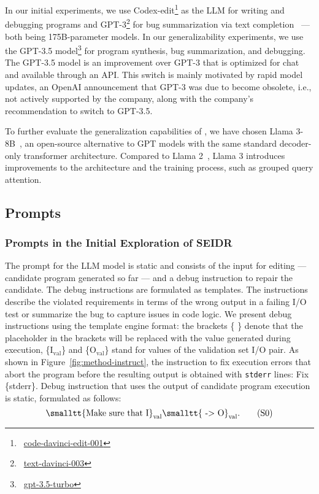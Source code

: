 In our initial experiments, we use Codex-edit\footnote{~\href{https://openai.com/index/gpt-3-edit-insert/}{code-davinci-edit-001}} 
as the LLM for writing and debugging programs and GPT-3\footnote{~\href{https://platform.openai.com/docs/deprecations}{text-davinci-003}} for bug summarization via text completion~\cite{brown2020:language} --- both being 175B-parameter models.
In our generalizability experiments, we use the GPT-3.5 model\footnote{~\href{https://platform.openai.com/docs/models/gpt-3-5-turbo}{gpt-3.5-turbo}} for program synthesis, bug summarization, and debugging. 
The GPT-3.5 model is an improvement over GPT-3 that is optimized for chat and available through an API.
This switch is mainly motivated by rapid model updates, an OpenAI announcement that GPT-3 was due to become obsolete, i.e., not actively supported by the company, along with the company's recommendation to switch to GPT-3.5. 

To further evaluate the generalization capabilities of \method{}, we have chosen Llama 3-8B~\cite{roziere2023:code}, an open-source alternative to GPT models with the same standard decoder-only transformer architecture. 
Compared to Llama 2~\cite{touvron2023:llama}, Llama 3 introduces improvements to the architecture and the training process, such as grouped query attention.

\subsection{Prompts}
\label{sec:prompts}

\subsubsection{Prompts in the Initial Exploration of SEIDR}
\label{sec:prompt-strategies}

The prompt for the LLM model is static and consists of the input for editing --- candidate program generated so far --- and a debug instruction to repair the candidate. 
The debug instructions are formulated as templates. The instructions describe the violated requirements in terms of the wrong output in a failing I/O test or summarize the bug to capture issues in code logic.
We present debug instructions using the template engine format: the brackets \{ \} denote that the placeholder in the brackets will be replaced with the value generated during execution, \{I$_{\text{val}}$\} and \{O$_{\text{val}}$\} stand for values of the validation set I/O pair. As shown in Figure~\ref{fig:method-instruct}, the instruction to fix execution errors that abort the program before the resulting output is obtained with \texttt{stderr} lines: Fix \{stderr\}. Debug instruction that uses the output of candidate program execution is static, formulated as follows: 
\begin{equation}\label{seidr:prompt-0} 
    \text{\smalltt{Make sure that I}}_{\text{val}} \text{\smalltt{ -> O}}_{\text{val}}. \tag{S0}
\end{equation}


